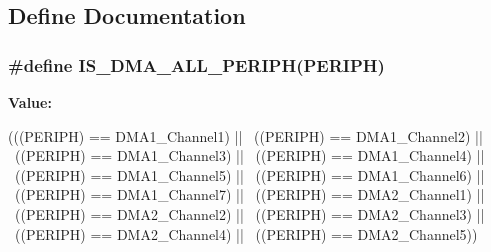 \subsection{Define Documentation}
\hypertarget{group__DMA__Exported__Constants_gabcab9fa1c48b148703a8f41c1d99e0c8}{
\subsubsection[{IS\_\-DMA\_\-ALL\_\-PERIPH}]{\setlength{\rightskip}{0pt plus 5cm}\#define IS\_\-DMA\_\-ALL\_\-PERIPH(PERIPH)}}
\label{group__DMA__Exported__Constants_gabcab9fa1c48b148703a8f41c1d99e0c8}
{\bfseries Value:}
\begin{DoxyCode}
(((PERIPH) == DMA1_Channel1) || \
                                   ((PERIPH) == DMA1_Channel2) || \
                                   ((PERIPH) == DMA1_Channel3) || \
                                   ((PERIPH) == DMA1_Channel4) || \
                                   ((PERIPH) == DMA1_Channel5) || \
                                   ((PERIPH) == DMA1_Channel6) || \
                                   ((PERIPH) == DMA1_Channel7) || \
                                   ((PERIPH) == DMA2_Channel1) || \
                                   ((PERIPH) == DMA2_Channel2) || \
                                   ((PERIPH) == DMA2_Channel3) || \
                                   ((PERIPH) == DMA2_Channel4) || \
                                   ((PERIPH) == DMA2_Channel5))
\end{DoxyCode}
